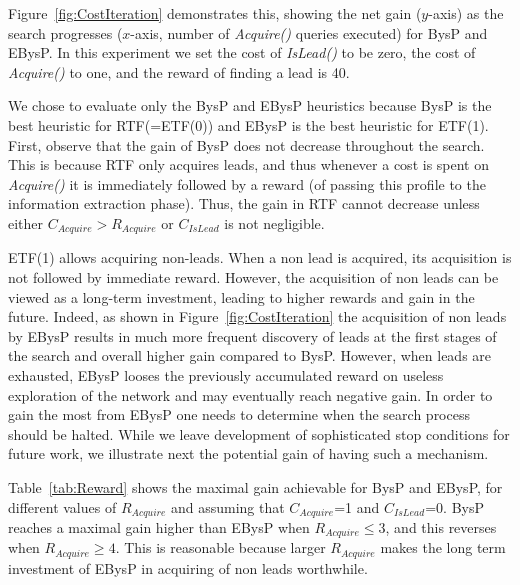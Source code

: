 \documentclass[journal]{IEEEtran}
\newcommand{\islead}[1]{{\em IsLead(#1)}}
\newcommand{\acquire}[1]{{\em Acquire(#1)}}
\begin{document}
Figure~\ref{fig:CostIteration} demonstrates this, showing the net gain ($y$-axis) as the search progresses ($x$-axis, number of \acquire{} queries executed) for BysP and EBysP. In this experiment we set the cost of \islead{} to be zero, the cost of \acquire{} to one, and the reward of finding a lead is 40.

We chose to evaluate only the BysP and EBysP heuristics because BysP is the best heuristic for RTF(=ETF(0)) and EBysP is the best heuristic for ETF(1). First, observe that the gain of BysP does not decrease throughout the search. This is because RTF only acquires leads, and thus whenever a cost is spent on \acquire{} it is immediately followed by a reward (of passing this profile to the information extraction phase). Thus, the gain in RTF cannot decrease unless either $C_{Acquire} > R_{Acquire}$ or $C_{IsLead}$ is not negligible.



ETF(1) allows acquiring non-leads. When a non lead is acquired, its acquisition
is not followed by immediate reward. However, the acquisition of non leads can
be viewed as a long-term investment, leading to higher rewards and gain in the
future. Indeed, as shown in Figure~\ref{fig:CostIteration} the acquisition of
non leads by EBysP results in much more frequent discovery of leads at the
first stages of the search and overall higher gain compared to BysP.
However, when leads are exhausted, EBysP looses the previously accumulated
reward on useless exploration of the network and may eventually reach negative
gain. In order to gain the most from EBysP one needs to determine when the
search process should be halted. While we leave development of sophisticated
stop conditions for future work, we illustrate next the potential gain of having
such a mechanism.

  


Table~\ref{tab:Reward} shows the maximal gain achievable for BysP and EBysP, for different values of $R_{Acquire}$ and assuming that $C_{Acquire}$=1 and $C_{IsLead}$=0. 
BysP reaches a maximal gain higher than EBysP when \(R_{Acquire} \leq 3 \), and this reverses when $R_{Acquire}\geq 4$. This is reasonable because larger $R_{Acquire}$ makes the long term investment of EBysP in
acquiring of non leads worthwhile.
\end{document}

